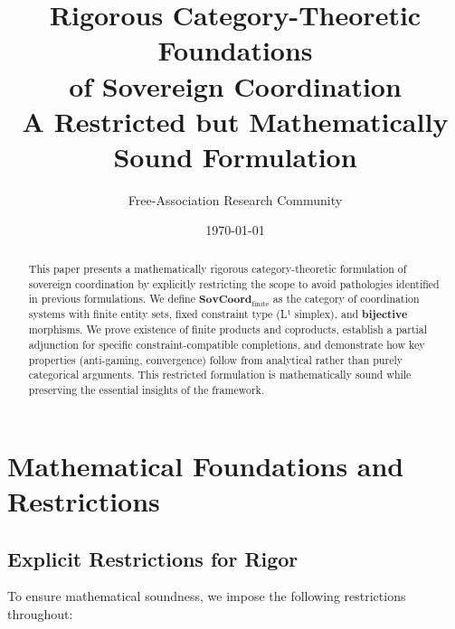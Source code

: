 \documentclass[11pt,a4paper]{article}
\title{\textbf{Rigorous Category-Theoretic Foundations \\
of Sovereign Coordination}\\
\large A Restricted but Mathematically Sound Formulation}
\author{Free-Association Research Community}
\date{\today}
\theoremstyle{definition}
\theoremstyle{remark}
\newcommand{\SovCoord}{\mathbf{SovCoord}}
\begin{document}
\maketitle

\begin{abstract}
This paper presents a mathematically rigorous category-theoretic formulation of sovereign coordination by explicitly restricting the scope to avoid pathologies identified in previous formulations. We define $\SovCoord_{\text{finite}}$ as the category of coordination systems with finite entity sets, fixed constraint type (L¹ simplex), and \textbf{bijective} morphisms. We prove existence of finite products and coproducts, establish a partial adjunction for specific constraint-compatible completions, and demonstrate how key properties (anti-gaming, convergence) follow from analytical rather than purely categorical arguments. This restricted formulation is mathematically sound while preserving the essential insights of the framework.
\end{abstract}

\section{Mathematical Foundations and Restrictions}

\subsection{Explicit Restrictions for Rigor}

To ensure mathematical soundness, we impose the following restrictions throughout:
\end{document}
